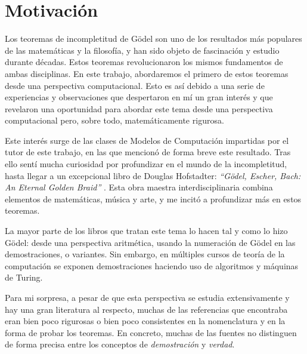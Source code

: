 

\chapter{Motivación}\label{ch:motivacion}

Los teoremas de incompletitud de Gödel son uno de los resultados más populares de las matemáticas y la filosofía, y han sido objeto de fascinación y estudio durante décadas. Estos teoremas revolucionaron los mismos fundamentos de ambas disciplinas. En este trabajo, abordaremos el primero de estos teoremas desde una perspectiva computacional. Esto es así debido a una serie de experiencias y observaciones que despertaron en mí un gran interés y que revelaron una oportunidad para abordar este tema desde una perspectiva computacional pero, sobre todo, matemáticamente rigurosa.

Este interés surge de las clases de Modelos de Computación impartidas por el tutor de este trabajo, en las que mencionó de forma breve este resultado. Tras ello sentí mucha curiosidad por profundizar en el mundo de la incompletitud, hasta llegar a un excepcional libro de Douglas Hofstadter: \emph{``Gödel, Escher, Bach: An Eternal Golden Braid''} \cite{Hofstadter1999}. Esta obra maestra interdisciplinaria combina elementos de matemáticas, música y arte, y me incitó a profundizar más en estos teoremas.

La mayor parte de los libros que tratan este tema lo hacen tal y como lo hizo Gödel: desde una perspectiva aritmética, usando la numeración de Gödel en las demostraciones, o variantes. Sin embargo, en múltiples cursos de teoría de la computación se exponen demostraciones haciendo uso de algoritmos y máquinas de Turing.

Para mi sorpresa, a pesar de que esta perspectiva se estudia extensivamente y hay una gran literatura al respecto, muchas de las referencias que encontraba eran bien poco rigurosas o bien poco consistentes en la nomenclatura y en la forma de probar los teoremas. En concreto, muchas de las fuentes no distinguen de forma precisa entre los conceptos de \emph{demostración} y \emph{verdad}.

